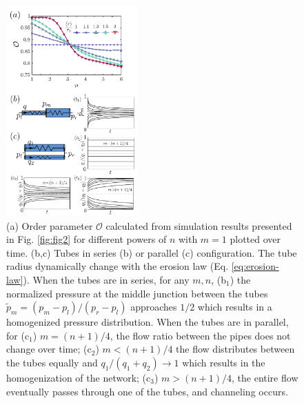 \documentclass[%
reprint,
 amsmath,amssymb,
 aps,
prl,
]{revtex4-1}
\begin{document}
\begin{figure}[!h]
     \includegraphics[width = 0.45\textwidth]{Fig3.pdf}
    \caption{ (a) Order parameter $\mathcal{O}$ calculated from simulation results presented in Fig. \ref{fig:fig2} for different powers of $n$ with $m=1$ plotted over time. (b,c) Tubes in series (b) or parallel (c) configuration. 
    The tube radius dynamically change with the erosion law (Eq. \eqref{eq:erosion-law}). When the tubes are in series, for any $m,n$, (b$_1$) the normalized pressure at the middle junction between the tubes $\tilde p_m = (p_m - p_l)/(p_r-p_l)$ approaches $1/2$ which results in a homogenized pressure distribution. 
    When the tubes are in parallel, for (c$_1$) $m=(n+1)/4$, the flow ratio between the pipes does not change over time; (c$_2$)  $m<(n+1)/4$ the flow distributes between the tubes equally and  $q_1/(q_1+q_2) \to 1$ which results in the homogenization of the network; (c$_3$) $m>(n+1)/4 $, the entire flow eventually passes through one of the tubes, and channeling occurs. }\label{fig:fig3}
\end{figure}
\end{document}
